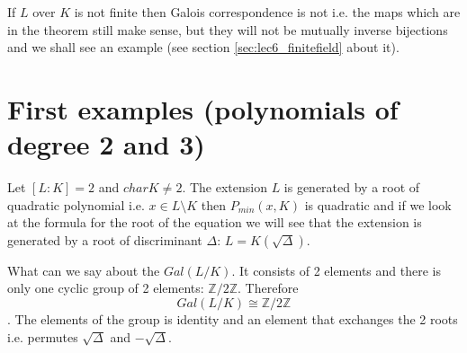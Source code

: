 \begin{remark}
  If $L$ over $K$ is not finite then Galois correspondence is not
   i.e. the maps which are in the theorem still
  make sense, but they will not be mutually inverse bijections and we
  shall see an example (see section \ref{sec:lec6_finitefield} about it).
  \label{rem:lec6_gcnotbijection}
\end{remark}

\section{First examples (polynomials of degree 2 and 3)}

\begin{example}[Degree 2]
  Let $\left[L:K\right] = 2$ and $char K \ne 2$. The extension $L$ is
  generated by a root of 
  quadratic polynomial i.e. $x \in L \setminus K$ then
  $P_{min}\left(x, K\right)$ is quadratic and if we look at the
  formula for the root of the equation we will see that the extension
  is generated by a root of discriminant $\Delta$:
  $L = K\left(\sqrt{\Delta}\right)$.

  What can we say about the $Gal\left(L/K\right)$. It consists of 2
  elements and there is only one cyclic group of 2 elements:
  $\mathbb{Z}/2\mathbb{Z}$. Therefore
  \[
  Gal\left(L/K\right) \cong \mathbb{Z}/2\mathbb{Z}
  \].
  The elements of the group is identity and an element that exchanges
  the 2 roots i.e. permutes $\sqrt{\Delta}$ and $-\sqrt{\Delta}$.
\end{example}

